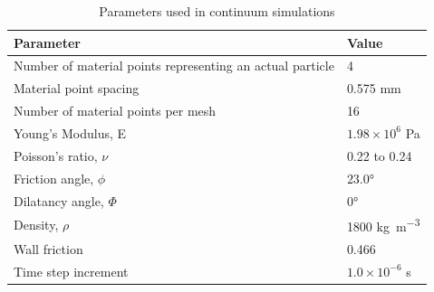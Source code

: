 \begin{table}
\caption{Parameters used in continuum simulations}
\label{table:MPMData}
\centering
\begin{tabular}{ll}
\toprule
\textbf{Parameter} & \textbf{Value} \\ \midrule
Number of material points representing an actual particle & 4 \\
Material point spacing & 0.575 \si{\mm} \\
Number of material points per mesh & 16 \\
Young's Modulus, E & $1.98 \times 10 ^{6}$ \si{\Pa} \\
Poisson's ratio, $\nu$ & 0.22 to 0.24 \\ 
Friction angle, $\phi$ & $23.0\si{\degree}$ \\
Dilatancy angle, $\varPhi$ & $0$\si{\degree} \\
Density, $\rho$ & 1800 \si{\kg\per\m\cubed}\\
Wall friction & 0.466 \\
Time step increment & $1.0 \times 10^{-6}$ \si{\second}\\ \bottomrule
\end{tabular}
\end{table}
